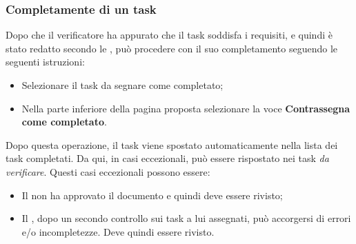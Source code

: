 \subsubsection{Completamente di un task}
Dopo che il verificatore ha appurato che il task soddisfa i requisiti, e quindi è stato redatto secondo le
\textsl{\NdP}, può procedere con il suo completamento seguendo le seguenti istruzioni:
\begin{itemize}
  \item Selezionare il task da segnare come completato;
  \item Nella parte inferiore della pagina proposta selezionare la voce \textbf{Contrassegna come 
  completato}.
\end{itemize}
Dopo questa operazione, il task viene spostato automaticamente nella lista dei task completati. Da qui, in
casi eccezionali, può essere rispostato nei task \textsl{da verificare}. Questi casi eccezionali possono essere:
\begin{itemize}
  \item Il \textsl{\RdP} non ha approvato il documento e quindi deve essere 
  rivisto;
  \item Il \textsl{\Ver}, dopo un secondo controllo sui task a lui assegnati, 
  può accorgersi di errori e/o incompletezze. Deve quindi essere rivisto.
\end{itemize}